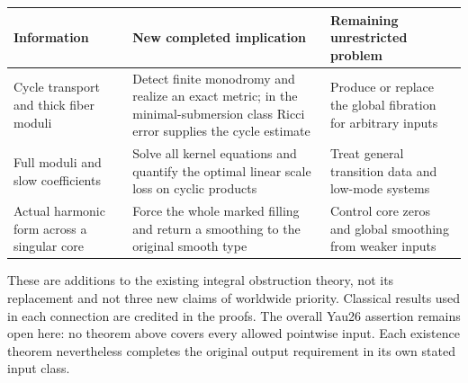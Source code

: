 \documentclass[
  11pt,
]{article}
\begin{document}
\begin{longtable}[]{@{}lll@{}}
\toprule
\begin{minipage}[b]{0.30\columnwidth}\raggedright
Information\strut
\end{minipage} & \begin{minipage}[b]{0.30\columnwidth}\raggedright
New completed implication\strut
\end{minipage} & \begin{minipage}[b]{0.30\columnwidth}\raggedright
Remaining unrestricted problem\strut
\end{minipage}\tabularnewline
\midrule
\endhead
\begin{minipage}[t]{0.30\columnwidth}\raggedright
Cycle transport and thick fiber moduli\strut
\end{minipage} & \begin{minipage}[t]{0.30\columnwidth}\raggedright
Detect finite monodromy and realize an exact metric; in the
minimal-submersion class Ricci error supplies the cycle estimate\strut
\end{minipage} & \begin{minipage}[t]{0.30\columnwidth}\raggedright
Produce or replace the global fibration for arbitrary inputs\strut
\end{minipage}\tabularnewline
\begin{minipage}[t]{0.30\columnwidth}\raggedright
Full moduli and slow coefficients\strut
\end{minipage} & \begin{minipage}[t]{0.30\columnwidth}\raggedright
Solve all kernel equations and quantify the optimal linear scale loss on
cyclic products\strut
\end{minipage} & \begin{minipage}[t]{0.30\columnwidth}\raggedright
Treat general transition data and low-mode systems\strut
\end{minipage}\tabularnewline
\begin{minipage}[t]{0.30\columnwidth}\raggedright
Actual harmonic form across a singular core\strut
\end{minipage} & \begin{minipage}[t]{0.30\columnwidth}\raggedright
Force the whole marked filling and return a smoothing to the original
smooth type\strut
\end{minipage} & \begin{minipage}[t]{0.30\columnwidth}\raggedright
Control core zeros and global smoothing from weaker inputs\strut
\end{minipage}\tabularnewline
\bottomrule
\end{longtable}

These are additions to the existing integral obstruction theory, not its
replacement and not three new claims of worldwide priority. Classical
results used in each connection are credited in the proofs. The overall
Yau26 assertion remains open here: no theorem above covers every allowed
pointwise input. Each existence theorem nevertheless completes the
original output requirement in its own stated input class.
\end{document}
